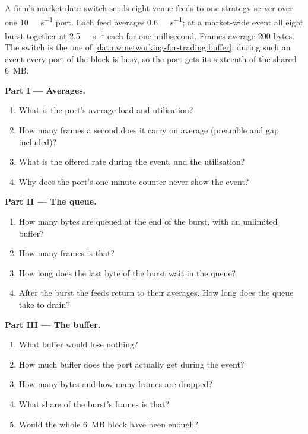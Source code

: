 \begin{problem}\label{pb:nw:networking-for-trading:1}
A firm's market-data switch sends eight venue feeds to one strategy server over one \qty{10}{\giga\bit\per\second} port. Each
feed averages \qty{0.6}{\giga\bit\per\second}; at a market-wide event all eight burst together at \qty{2.5}{\giga\bit\per\second}
each for one millisecond. Frames average 200 bytes. The switch is the one of \cref{dat:nw:networking-for-trading:buffer}; during
such an event every port of the block is busy, so the port gets its sixteenth of the shared 6~MB.

\medskip\noindent\textbf{Part I --- Averages.}
\begin{enumerate}
\item What is the port's average load and utilisation?
\item How many frames a second does it carry on average (preamble and gap included)?
\item What is the offered rate during the event, and the utilisation?
\item Why does the port's one-minute counter never show the event?
\end{enumerate}

\medskip\noindent\textbf{Part II --- The queue.}
\begin{enumerate}[resume]
\item How many bytes are queued at the end of the burst, with an unlimited buffer?
\item How many frames is that?
\item How long does the last byte of the burst wait in the queue?
\item After the burst the feeds return to their averages. How long does the queue take to drain?
\end{enumerate}

\medskip\noindent\textbf{Part III --- The buffer.}
\begin{enumerate}[resume]
\item What buffer would lose nothing?
\item How much buffer does the port actually get during the event?
\item How many bytes and how many frames are dropped?
\item What share of the burst's frames is that?
\item Would the whole 6~MB block have been enough?
\end{enumerate}


\end{problem}

